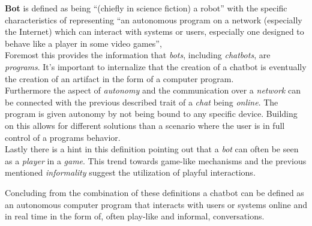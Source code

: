 \textbf{Bot} is defined as being ``(chiefly in science fiction) a robot'' with the specific characteristics of representing ``an autonomous program on a network (especially the Internet) which can interact with systems or users, especially one designed to behave like a player in some video games''\cite{oxfordbot},
\\
Foremost this provides the information that \emph{bots}, including \emph{chatbots}, are \emph{programs}.
It's important to internalize that the creation of a chatbot is eventually the creation of an artifact in the form of a computer program.
\\
Furthermore the aspect of \emph{autonomy} and the communication over a \emph{network} can be connected with the previous described trait of a \emph{chat} being \emph{online}.
The program is given autonomy by not being bound to any specific device. Building on this allows for different solutions than a scenario where the user is in full control of a programs behavior.
\\
Lastly there is a hint in this definition pointing out that a \emph{bot} can often be seen as a \emph{player} in a \emph{game}.
This trend towards game-like mechanisms and the previous mentioned \emph{informality} suggest the utilization of playful interactions.

Concluding from the combination of these definitions a chatbot can be defined as an autonomous computer program that interacts with users or systems online and in real time in the form of, often play-like and informal, conversations.
